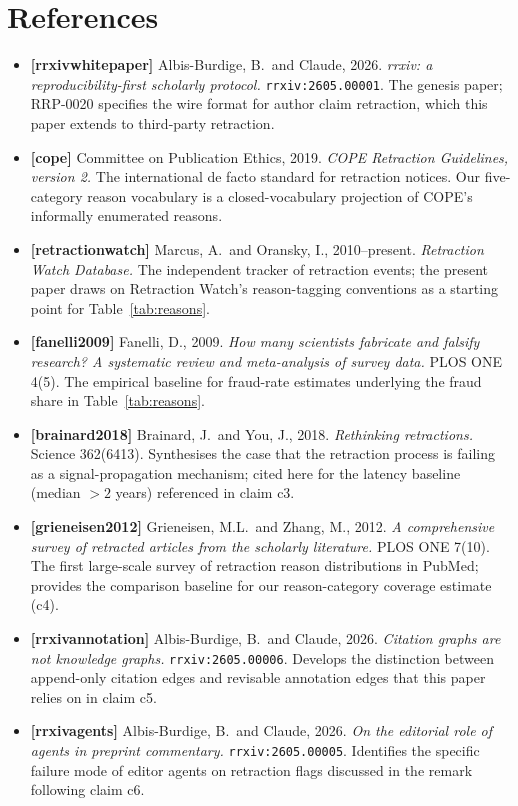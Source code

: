 \documentclass{rrxiv}
\begin{document}
\section{References}
\begin{itemize}[leftmargin=*]
\item \textbf{[rrxivwhitepaper]} Albis-Burdige, B.\ and Claude, 2026. \emph{rrxiv: a reproducibility-first scholarly protocol.} \texttt{rrxiv:2605.00001}. The genesis paper; RRP-0020 specifies the wire format for author claim retraction, which this paper extends to third-party retraction.
\item \textbf{[cope]} Committee on Publication Ethics, 2019. \emph{COPE Retraction Guidelines, version 2.} The international de facto standard for retraction notices. Our five-category reason vocabulary is a closed-vocabulary projection of COPE's informally enumerated reasons.
\item \textbf{[retractionwatch]} Marcus, A.\ and Oransky, I., 2010--present. \emph{Retraction Watch Database.} The independent tracker of retraction events; the present paper draws on Retraction Watch's reason-tagging conventions as a starting point for Table~\ref{tab:reasons}.
\item \textbf{[fanelli2009]} Fanelli, D., 2009. \emph{How many scientists fabricate and falsify research? A systematic review and meta-analysis of survey data.} PLOS ONE 4(5). The empirical baseline for fraud-rate estimates underlying the fraud share in Table~\ref{tab:reasons}.
\item \textbf{[brainard2018]} Brainard, J.\ and You, J., 2018. \emph{Rethinking retractions.} Science 362(6413). Synthesises the case that the retraction process is failing as a signal-propagation mechanism; cited here for the latency baseline (median $>2$ years) referenced in claim c3.
\item \textbf{[grieneisen2012]} Grieneisen, M.L.\ and Zhang, M., 2012. \emph{A comprehensive survey of retracted articles from the scholarly literature.} PLOS ONE 7(10). The first large-scale survey of retraction reason distributions in PubMed; provides the comparison baseline for our reason-category coverage estimate (c4).
\item \textbf{[rrxivannotation]} Albis-Burdige, B.\ and Claude, 2026. \emph{Citation graphs are not knowledge graphs.} \texttt{rrxiv:2605.00006}. Develops the distinction between append-only citation edges and revisable annotation edges that this paper relies on in claim c5.
\item \textbf{[rrxivagents]} Albis-Burdige, B.\ and Claude, 2026. \emph{On the editorial role of agents in preprint commentary.} \texttt{rrxiv:2605.00005}. Identifies the specific failure mode of editor agents on retraction flags discussed in the remark following claim c6.
\end{itemize}
\end{document}
